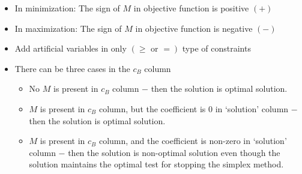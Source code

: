 \documentclass[../main-sheet.tex]{subfiles}
\begin{document}
\begin{itemize}
    \item In minimization: The sign of \(M\) in objective function is positive \((+)\)
    \item In maximization: The sign of \(M\) in objective function is negative \((-)\)
    \item Add artificial variables in only \((\geq \text{ or }=)\) type of constraints
    \item There can be three cases in the \(c_B\) column
    \begin{itemize}
        \item No \(M\) is present in \(c_B\) column \(-\) then the solution is optimal solution.
        \item \(M\) is present in \(c_B\) column, but the coefficient is 0 in `solution' column \(-\) then the solution is optimal solution.
        \item \(M\) is present in \(c_B\) column, and the coefficient is non-zero in `solution' column \(-\) then the solution is non-optimal solution even though the solution maintains the optimal test for stopping the simplex method.
    \end{itemize}
\end{itemize}
\end{document}
